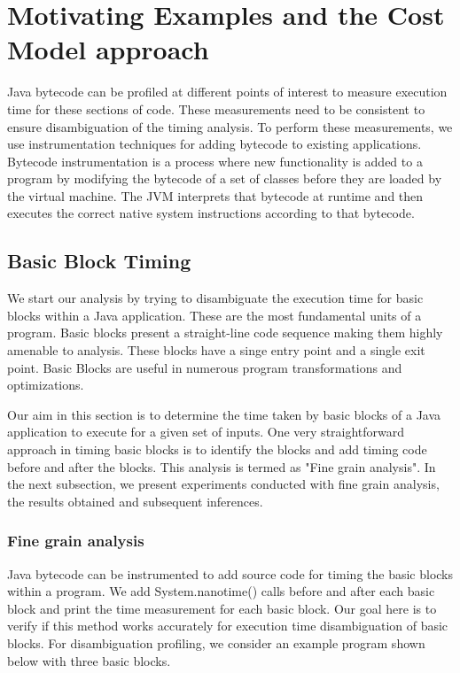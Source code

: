 \documentclass[11pt]{article}
\begin{document}
\newpage
\section{Motivating Examples and the Cost Model approach}
Java bytecode can be profiled at different points of interest to measure execution time for these sections of code. These measurements need to be consistent to ensure disambiguation of the timing analysis. To perform these measurements, we use instrumentation techniques for adding bytecode to existing applications. Bytecode instrumentation is a process where new functionality is added to a program by modifying the bytecode of a set of classes before they are loaded by the virtual machine. The JVM interprets that bytecode at runtime and then executes the correct native system instructions according to that bytecode.

\subsection{Basic Block Timing} 

We start our analysis by trying to disambiguate the execution time for basic blocks within a Java application. These are the most fundamental units of a program. Basic blocks present a straight-line code sequence making them highly amenable to analysis. These blocks have a singe entry point and a single exit point. Basic Blocks are useful in numerous program transformations and optimizations.\newline

Our aim in this section is to determine the time taken by basic blocks of a Java application to execute for a given set of inputs. One very straightforward approach in timing basic blocks is to identify the blocks and add timing code before and after the blocks. This analysis is termed as "Fine grain analysis". In the next subsection, we present experiments conducted with fine grain analysis, the results obtained and subsequent inferences.

\subsubsection{Fine grain analysis}
Java bytecode can be instrumented to add source code for timing the basic blocks within a program. We add System.nanotime() calls before and after each basic block and print the time measurement for each basic block. Our goal here is to verify if this method works accurately for execution time disambiguation of basic blocks. For disambiguation profiling, we consider an example program shown below with three basic blocks.\newline
\end{document}

